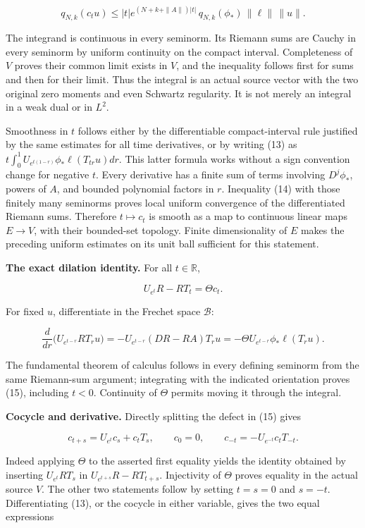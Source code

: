 \documentclass[10pt,a4paper,oneside]{report}
\begin{document}
\[
q_{N,k}(c_tu)
\leq |t|e^{(N+k+\|A\|)|t|}\,
q_{N,k}(\phi_*)\,\|\ell\|\,\|u\|.\tag{14}
\]

The integrand is continuous in every seminorm. Its Riemann sums are
Cauchy in every seminorm by uniform continuity on the compact interval.
Completeness of \(V\) proves their common limit exists in \(V\), and the
inequality follows first for sums and then for their limit. Thus the
integral is an actual source vector with the two original zero moments
and even Schwartz regularity. It is not merely an integral in a weak
dual or in \(L^2\).

Smoothness in \(t\) follows either by the differentiable
compact-interval rule justified by the same estimates for all time
derivatives, or by writing (13) as
\(t\int_0^1 U_{e^{t(1-r)}}\phi_*\ell(T_{tr}u)dr\). This latter formula
works without a sign convention change for negative \(t\). Every
derivative has a finite sum of terms involving \(D^j\phi_*\), powers of
\(A\), and bounded polynomial factors in \(r\). Inequality (14) with
those finitely many seminorms proves local uniform convergence of the
differentiated Riemann sums. Therefore \(t\mapsto c_t\) is smooth as a
map to continuous linear maps \(E\to V\), with their bounded-set
topology. Finite dimensionality of \(E\) makes the preceding uniform
estimates on its unit ball sufficient for this statement.

\textbf{The exact dilation identity.} For all \(t\in\mathbb R\),

\[\boxed{U_{e^t}R-RT_t=\Theta c_t.}\tag{15}\]

For fixed \(u\), differentiate in the Frechet space \(\mathscr B\):

\[
\frac{d}{dr}\bigl(U_{e^{t-r}}RT_ru\bigr)
=-U_{e^{t-r}}(DR-RA)T_ru
=-\Theta U_{e^{t-r}}\phi_*\ell(T_ru).
\]

The fundamental theorem of calculus follows in every defining seminorm
from the same Riemann-sum argument; integrating with the indicated
orientation proves (15), including \(t<0\). Continuity of \(\Theta\)
permits moving it through the integral.

\textbf{Cocycle and derivative.} Directly splitting the defect in (15)
gives

\[
\boxed{c_{t+s}=U_{e^t}c_s+c_tT_s,\qquad
c_0=0,\qquad
c_{-t}=-U_{e^{-t}}c_tT_{-t}.}\tag{16}
\]

Indeed applying \(\Theta\) to the asserted first equality yields the
identity obtained by inserting \(U_{e^t}RT_s\) in
\(U_{e^{t+s}}R-RT_{t+s}\). Injectivity of \(\Theta\) proves equality in
the actual source \(V\). The other two statements follow by setting
\(t=s=0\) and \(s=-t\). Differentiating (13), or the cocycle in either
variable, gives the two equal expressions
\end{document}
